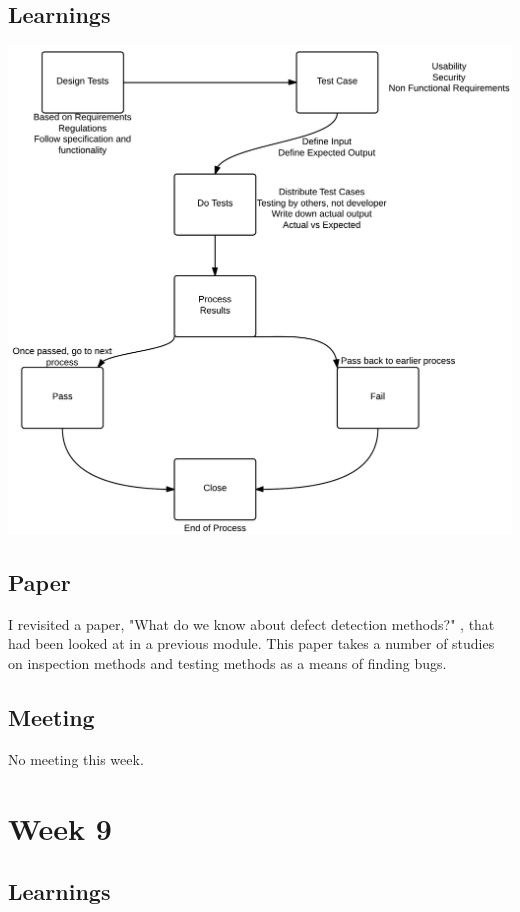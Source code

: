 \section{Learnings}
\begin{center}
\includegraphics[scale=0.24]{testing.png}
\end{center}

\section{Paper}

I revisited a paper, "What do we know about defect detection methods?" \parencite{defect}, that had been looked at in a previous module. This paper takes a number of studies on inspection methods and testing methods as a means of finding bugs.

\section{Meeting}

No meeting this week.

\chapter{Week 9}

\section{Learnings}


